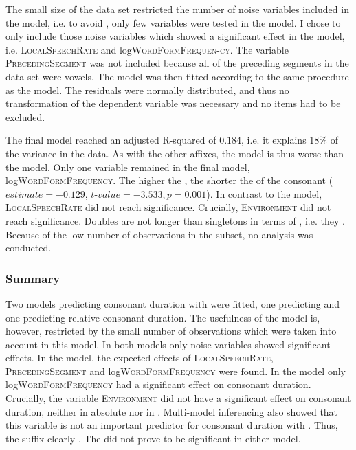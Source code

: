 The small size of the data set restricted the number of noise variables included in the model, i.e. to avoid , only few variables were tested in the model. I chose to only include those noise variables which showed a significant effect in the  model, i.e. \textsc{LocalSpeechRate} and log\textsc{WordFormFrequen-cy}. The variable \textsc{PrecedingSegment} was not included because all of the preceding segments in the data set were vowels. The model was then fitted according to the same procedure as the  model. The residuals were normally distributed, and thus no transformation of the dependent variable was necessary and no items had to be excluded.

The final model reached an adjusted R-squared of $0.184$, i.e. it explains 18\% of the variance in the data. As with the other affixes, the  model is thus worse than the  model. Only one variable remained in the final model, log\textsc{WordFormFrequency}. The higher the , the shorter the  of the consonant ($estimate= -0.129$, $t$-$value=-3.533, p=0.001$). In contrast to the  model, \textsc{LocalSpeechRate} did not reach significance. Crucially, \textsc{Environment} did not reach significance. Doubles are not longer than singletons in terms of , i.e. they .
Because of the low number of observations in the subset, no  analysis was conducted.

\subsubsection{Summary}
Two models predicting consonant duration with  were fitted, one predicting  and one predicting relative consonant duration. The usefulness of the  model is, however,  restricted by the small number of observations which were taken into account in this model. In both models only noise variables showed significant effects. 
In the  model, the expected effects of \textsc{LocalSpeechRate}, \textsc{PrecedingSegment} and log\textsc{WordFormFrequency} were found. In the  model only log\textsc{WordFormFrequency} had a significant effect on consonant duration.
Crucially, the variable \textsc{Environment} did not have a significant effect on consonant duration, neither in absolute nor in . Multi-model inferencing also showed that this variable is not an important predictor for consonant duration with . Thus, the suffix  clearly .
The  did not prove to be significant in either model.




